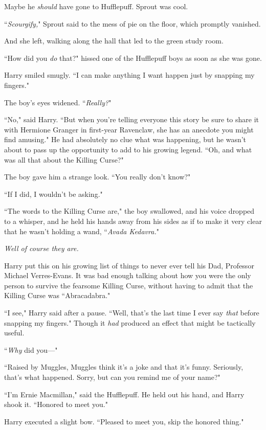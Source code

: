 Maybe he \emph{should} have gone to Hufflepuff. Sprout was cool.

``\emph{Scourgify,}" Sprout said to the mess of pie on the floor, which promptly vanished.

And she left, walking along the hall that led to the green study room.

``How did you \emph{do} that?" hissed one of the Hufflepuff boys as soon as she was gone.

Harry smiled smugly. ``I can make anything I want happen just by snapping my fingers."

The boy's eyes widened. ``\emph{Really?}"

``No," said Harry. ``But when you're telling everyone this story be sure to share it with Hermione Granger in first-year Ravenclaw, she has an anecdote you might find amusing." He had absolutely no clue what was happening, but he wasn't about to pass up the opportunity to add to his growing legend. ``Oh, and what was all that about the Killing Curse?"

The boy gave him a strange look. ``You really don't know?"

``If I did, I wouldn't be asking."

``The words to the Killing Curse are," the boy swallowed, and his voice dropped to a whisper, and he held his hands away from his sides as if to make it very clear that he wasn't holding a wand, ``\emph{Avada Kedavra.}"

\emph{Well of course they are.}

Harry put this on his growing list of things to never ever tell his Dad, Professor Michael Verres-Evans. It was bad enough talking about how you were the only person to survive the fearsome Killing Curse, without having to admit that the Killing Curse was ``Abracadabra."

``I see," Harry said after a pause. ``Well, that's the last time I ever say \emph{that} before snapping my fingers." Though it \emph{had} produced an effect that might be tactically useful.

``\emph{Why} did you—"

``Raised by Muggles, Muggles think it's a joke and that it's funny. Seriously, that's what happened. Sorry, but can you remind me of your name?"

``I'm Ernie Macmillan," said the Hufflepuff. He held out his hand, and Harry shook it. ``Honored to meet you."

Harry executed a slight bow. ``Pleased to meet you, skip the honored thing."


